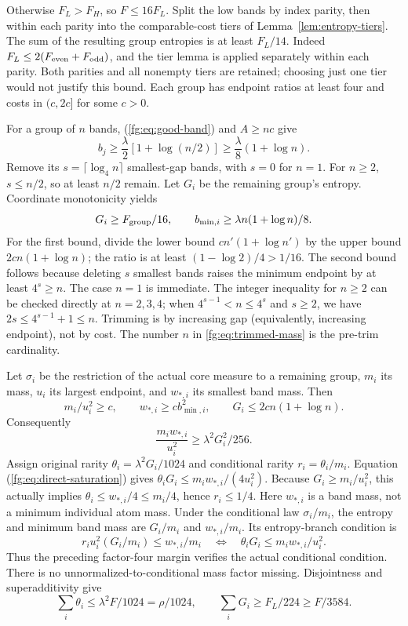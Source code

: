 Otherwise $F_L>F_H$, so $F\le16F_L$.
Split the low bands by index parity, then within each parity into the
comparable-cost tiers of Lemma~\ref{lem:entropy-tiers}.
The sum of the resulting group entropies is at least $F_L/14$.
Indeed $F_L\le2(F_{\rm even}+F_{\rm odd})$, and the tier lemma is
applied separately within each parity. Both parities and all nonempty
tiers are retained; choosing just one tier would not justify this bound.
Each group has endpoint ratios at least four and costs in $(c,2c]$
for some $c>0$.

For a group of $n$ bands, (\ref{fg:eq:good-band}) and $A\ge nc$ give
\[
 b_j\ge\frac\lambda2[1+\log(n/2)]
       \ge\frac\lambda8(1+\log n).
\]
Remove its $s=\lceil\log_4n\rceil$ smallest-gap bands, with $s=0$
for $n=1$. For $n\ge2$, $s\le n/2$, so at least $n/2$ remain.
Let $G_i$ be the remaining group's entropy. Coordinate monotonicity yields
\begin{equation}\label{fg:eq:trimmed-mass}
 G_i\ge F_{\rm group}/16,\qquad
 b_{\min,i}\ge\lambda n(1+\log n)/8.
\end{equation}
For the first bound, divide the lower bound
$cn'(1+\log n')$ by the upper bound $2cn(1+\log n)$;
the ratio is at least $(1-\log2)/4>1/16$.
The second bound follows because deleting $s$ smallest bands raises
the minimum endpoint by at least $4^s\ge n$.
The case $n=1$ is immediate. The integer inequality for $n\ge2$
can be checked directly at $n=2,3,4$; when
$4^{s-1}<n\le4^s$ and $s\ge2$, we have
$2s\le4^{s-1}+1\le n$. Trimming is by increasing gap (equivalently,
increasing endpoint), not by cost. The number $n$ in
\eqref{fg:eq:trimmed-mass} is the pre-trim cardinality.

Let $\sigma_i$ be the restriction of the actual core measure to a
remaining group, $m_i$ its mass, $u_i$ its largest endpoint, and
$w_{*,i}$ its smallest band mass. Then
\[
 m_i/u_i^2\ge c,\qquad w_{*,i}\ge c b_{\min,i}^2,
 \qquad G_i\le2cn(1+\log n).
\]
Consequently
\begin{equation}\label{fg:eq:direct-saturation}
                 \frac{m_iw_{*,i}}{u_i^2}\ge\lambda^2G_i^2/256.
\end{equation}
Assign original rarity $\theta_i=\lambda^2G_i/1024$ and conditional
rarity $r_i=\theta_i/m_i$.
Equation (\ref{fg:eq:direct-saturation}) gives
$\theta_iG_i\le m_iw_{*,i}/(4u_i^2)$.
Because $G_i\ge m_i/u_i^2$, this actually implies
$\theta_i\le w_{*,i}/4\le m_i/4$, hence $r_i\le1/4$.
Here $w_{*,i}$ is a band mass, not a minimum individual atom mass.
Under the conditional law $\sigma_i/m_i$, the entropy and minimum
band mass are $G_i/m_i$ and $w_{*,i}/m_i$. Its entropy-branch condition is
\[
 r_i u_i^2(G_i/m_i)\le w_{*,i}/m_i
 \quad\Longleftrightarrow\quad
 \theta_iG_i\le m_iw_{*,i}/u_i^2.
\]
Thus the preceding factor-four margin verifies the actual conditional
condition. There is no unnormalized-to-conditional mass factor missing.
Disjointness and superadditivity give
\[
 \sum_i\theta_i\le\lambda^2F/1024=\rho/1024,
 \qquad \sum_iG_i\ge F_L/224\ge F/3584.
\]

